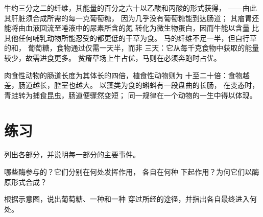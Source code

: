 \begin{example}[吃草地的两种方式]\label{ex:b1:digestion-absorption:cowhorse}
牛约三分之二的纤维，其能量的百分之六十以乙酸和丙酸的形式获得，
——由此其肝脏须合成所需的每一克葡萄糖，
因为几乎没有葡萄糖能到达肠道；
其瘤胃还能将由血液回流至唾液中的尿素所含的氮
转化为微生物蛋白，因而牛能以含量
比其他任何哺乳动物所能忍受的都更低的干草为食。
马的纤维不足一半，但自行草的和，
葡萄糖，食物通过仅需一天半，而非
三天：它从每千克食物中获取的能量较少，故需进食更多。
贫瘠草场上牛占优，马则在必须奔跑时占优。
\end{example}

\begin{remark}[肠道的长度]\label{rem:b1:digestion-absorption:length}
肉食性动物的肠道长度为其体长的四倍，植食性动物则为
十至二十倍：食物越差，肠道越长，腔室也越大。
以藻类为食的蝌蚪有一段盘曲的长肠，
在变态时，青蛙转为捕食昆虫，肠道便骤然变短；
同一规律在一个动物的一生中得以体现。
\end{remark}

\section{练习}

\begin{exercise}[$\star$]\label{exo:b1:digestion-absorption:1}
列出各部分，并说明每一部分的主要事件。
\end{exercise}

\begin{exercise}[$\star$]\label{exo:b1:digestion-absorption:2}
哪些酶参与的？它们分别在何处发挥作用，
各自在何种  下起作用？为何它们以酶原形式合成？
\end{exercise}

\begin{exercise}[$\star$]\label{exo:b1:digestion-absorption:3}
根据示意图，说出葡萄糖、一种和一种
穿过所经的途径，并指出各自最终进入何处。
\end{exercise}

